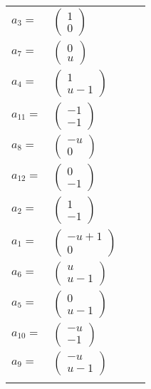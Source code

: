 \documentclass[1p]{elsarticle_modified}
\theoremstyle{definition}
\begin{document}
\begin{tabular}{m{7pt} m{180pt} m{7pt} m{180pt} }
\flushright $a_{3}=$&$\begin{pmatrix}1\\0\end{pmatrix}$ \\
\flushright $a_{7}=$&$\begin{pmatrix}0\\u\end{pmatrix}$ \\
\flushright $a_{4}=$&$\begin{pmatrix}1\\u-1\end{pmatrix}$ \\
\flushright $a_{11}=$&$\begin{pmatrix}-1\\-1\end{pmatrix}$ \\
\flushright $a_{8}=$&$\begin{pmatrix}- u\\0\end{pmatrix}$ \\
\flushright $a_{12}=$&$\begin{pmatrix}0\\-1\end{pmatrix}$ \\
\flushright $a_{2}=$&$\begin{pmatrix}1\\-1\end{pmatrix}$ \\
\flushright $a_{1}=$&$\begin{pmatrix}- u+1\\0\end{pmatrix}$ \\
\flushright $a_{6}=$&$\begin{pmatrix}u\\u-1\end{pmatrix}$ \\
\flushright $a_{5}=$&$\begin{pmatrix}0\\u-1\end{pmatrix}$ \\
\flushright $a_{10}=$&$\begin{pmatrix}- u\\-1\end{pmatrix}$ \\
\flushright $a_{9}=$&$\begin{pmatrix}- u\\u-1\end{pmatrix}$\\&\end{tabular}
\end{document}
